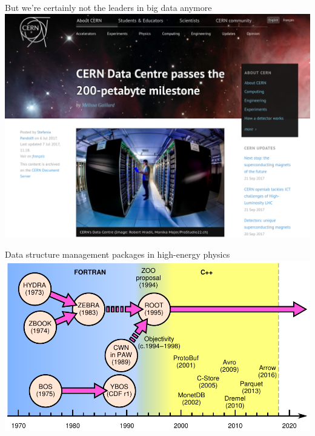 \documentclass[aspectratio=169]{beamer}
\begin{document}
\begin{frame}{But we're certainly not the leaders in big data anymore}
\vspace{0.35 cm}
\includegraphics[width=0.73\linewidth]{cern-200pb.png}

\vspace{-4.8 cm}
\end{frame}

\begin{frame}{Data structure management packages in high-energy physics}
\vspace{0.25 cm}
\includegraphics[width=\linewidth]{history.pdf}
\end{frame}
\end{document}
